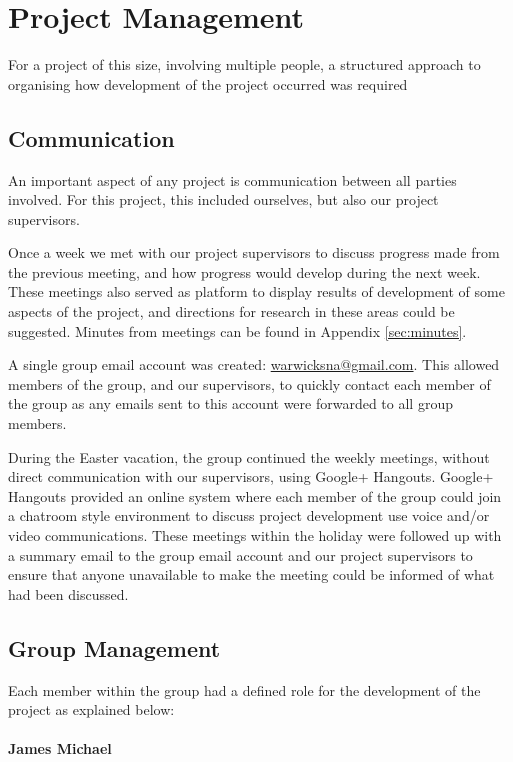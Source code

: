 \section{Project Management}
For a project of this size, involving multiple people, a structured approach to organising how development of the project occurred was required

\subsection{Communication}
An important aspect of any project is communication between all parties involved. For this project, this included ourselves, but also our project supervisors.

Once a week we met with our project supervisors to discuss progress made from the previous meeting, and how progress would develop during the next week. These meetings also served as platform to display results of development of some aspects of the project, and directions for research in these areas could be suggested. Minutes from meetings can be found in Appendix \ref{sec:minutes}.

A single group email account was created: \href{mailto:warwicksna@gmail.com}{warwicksna@gmail.com}. This allowed members of the group, and our supervisors, to quickly contact each member of the group as any emails sent to this account were forwarded to all group members.

During the Easter vacation, the group continued the weekly meetings, without direct communication with our supervisors, using Google+ Hangouts. Google+ Hangouts provided an online system where each member of the group could join a chatroom style environment to discuss project development use voice and/or video communications. These meetings within the holiday were followed up with a summary email to the group email account and our project supervisors to ensure that anyone unavailable to make the meeting could be informed of what had been discussed.

\subsection{Group Management}
Each member within the group had a defined role for the development of the project as explained below:

\paragraph{James Michael}



